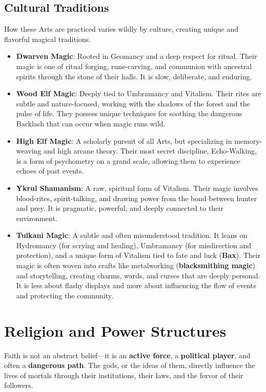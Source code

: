 \subsection*{Cultural Traditions}

How these Arts are practiced varies wildly by culture, creating unique and flavorful magical traditions.

\begin{itemize}
    \item \textbf{Dwarven Magic}: Rooted in Geomancy and a deep respect for ritual. Their magic is one of ritual forging, rune-carving, and communion with ancestral spirits through the stone of their halls. It is slow, deliberate, and enduring.
    \item \textbf{Wood Elf Magic}: Deeply tied to Umbramancy and Vitalism. Their rites are subtle and nature-focused, working with the shadows of the forest and the pulse of life. They possess unique techniques for soothing the dangerous Backlash that can occur when magic runs wild.
    \item \textbf{High Elf Magic}: A scholarly pursuit of all Arts, but specializing in memory-weaving and high arcane theory. Their most secret discipline, Echo-Walking, is a form of psychometry on a grand scale, allowing them to experience echoes of past events.
    \item \textbf{Ykrul Shamanism}: A raw, spiritual form of Vitalism. Their magic involves blood-rites, spirit-talking, and drawing power from the bond between hunter and prey. It is pragmatic, powerful, and deeply connected to their environment.
    \item \textbf{Tulkani Magic}: A subtle and often misunderstood tradition. It leans on Hydromancy (for scrying and healing), Umbramancy (for misdirection and protection), and a unique form of Vitalism tied to fate and luck (\textbf{Bax}). Their magic is often woven into crafts like metalworking (\textbf{blacksmithing magic}) and storytelling, creating charms, wards, and curses that are deeply personal. It is less about flashy displays and more about influencing the flow of events and protecting the community.
\end{itemize}

\section*{Religion and Power Structures}

Faith is not an abstract belief---it is an \textbf{active force}, a \textbf{political player}, and often a \textbf{dangerous path}. The gods, or the ideas of them, directly influence the lives of mortals through their institutions, their laws, and the fervor of their followers.

